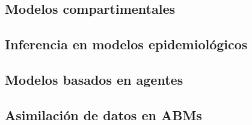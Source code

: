 \subsection{Modelos compartimentales}
\subsection{Inferencia en modelos epidemiológicos}
\subsection{Modelos basados en agentes}
\subsection{Asimilación de datos en ABMs}

